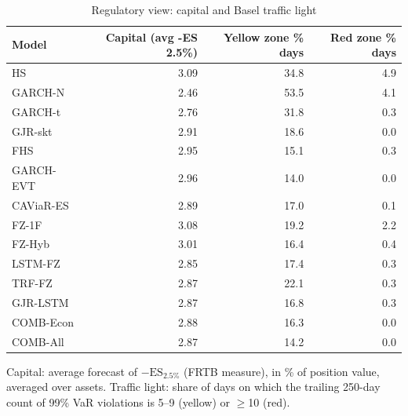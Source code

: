 \begin{table}[htbp]
\centering
\footnotesize
\caption{Regulatory view: capital and Basel traffic light}
\label{tab:reg}
\begin{tabular}{lrrr}
\toprule
Model & Capital (avg -ES 2.5\%) & Yellow zone \% days & Red zone \% days \\
\midrule
HS & 3.09 & 34.8 & 4.9 \\
GARCH-N & 2.46 & 53.5 & 4.1 \\
GARCH-t & 2.76 & 31.8 & 0.3 \\
GJR-skt & 2.91 & 18.6 & 0.0 \\
FHS & 2.95 & 15.1 & 0.3 \\
GARCH-EVT & 2.96 & 14.0 & 0.0 \\
CAViaR-ES & 2.89 & 17.0 & 0.1 \\
FZ-1F & 3.08 & 19.2 & 2.2 \\
FZ-Hyb & 3.01 & 16.4 & 0.4 \\
LSTM-FZ & 2.85 & 17.4 & 0.3 \\
TRF-FZ & 2.87 & 22.1 & 0.3 \\
GJR-LSTM & 2.87 & 16.8 & 0.3 \\
COMB-Econ & 2.88 & 16.3 & 0.0 \\
COMB-All & 2.87 & 14.2 & 0.0 \\
\bottomrule
\end{tabular}
\par\smallskip\parbox{\linewidth}{\scriptsize Capital: average forecast of $-\mathrm{ES}_{2.5\%}$ (FRTB measure), in \% of position value, averaged over assets. Traffic light: share of days on which the trailing 250-day count of 99\% VaR violations is 5--9 (yellow) or $\geq$10 (red).}
\end{table}